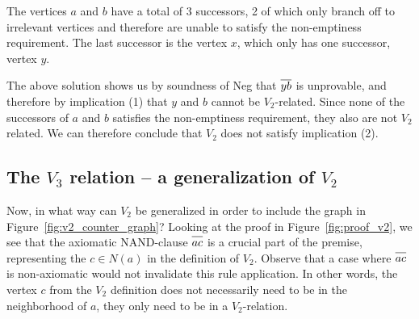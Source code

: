 The vertices $a$ and $b$ have a total of 3 successors, 2 of which only branch off to irrelevant vertices and therefore are unable to satisfy the non-emptiness requirement.
The last successor is the vertex $x$, which only has one successor, vertex $y$.\par
\begin{figure}[!h]
  \centering
  \caption{}
  \label{fig:v2_counter_assignment}
\end{figure}
\FloatBarrier
The above solution shows us by soundness of Neg that $\ol{yb}$ is unprovable, and therefore by implication (1) that $y$ and $b$ cannot be $V_2$-related.
Since none of the successors of $a$ and $b$ satisfies the non-emptiness requirement, they also are not $V_2$ related.
We can therefore conclude that $V_2$ does not satisfy implication (2).

\subsection{The $V_3$ relation -- a generalization of $V_2$}
\label{sub:The V3 construction}
Now, in what way can $V_2$ be generalized in order to include the graph in Figure~\ref{fig:v2_counter_graph}?
Looking at the proof in Figure~\ref{fig:proof_v2}, we see that the axiomatic NAND-clause $\ol{ac}$ is a crucial part of the premise, representing the $c \in N(a)$ in the definition of $V_2$.
Observe that a case where $\ol{ac}$ is non-axiomatic would not invalidate this rule application.
In other words, the vertex $c$ from the $V_2$ definition does not necessarily need to be in the neighborhood of $a$, they only need to be in a $V_2$-relation.

